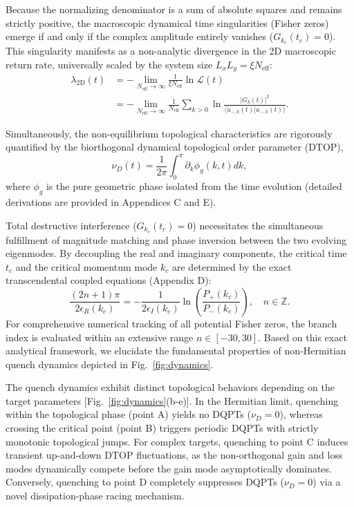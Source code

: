 \documentclass[aps,prb,floatfix,superscriptaddress,reprint]{revtex4-2}
\begin{document}
Because the normalizing denominator is a sum of absolute squares and remains strictly positive, the macroscopic dynamical time singularities (Fisher zeros) emerge if and only if the complex amplitude entirely vanishes ($G_{k_c}(t_c) = 0$). This singularity manifests as a non-analytic divergence in the 2D macroscopic return rate, universally scaled by the system size $L_x L_y = \xi N_{\mathrm{eff}}$:
\begin{align}
    \lambda_{\mathrm{2D}}(t) &= -\lim_{N_{\mathrm{eff}} \to \infty} \frac{1}{\xi N_{\mathrm{eff}}} \ln \mathcal{L}(t) \nonumber \\
    &= -\lim_{N_{\mathrm{eff}} \to \infty} \frac{1}{N_{\mathrm{eff}}} \sum_{k>0} \ln \frac{|G_k(t)|^2}{\langle \tilde{u}_{-,k}(t) | u_{-,k}(t) \rangle}.
\end{align}

Simultaneously, the non-equilibrium topological characteristics are rigorously quantified by the biorthogonal dynamical topological order parameter (DTOP),
\begin{equation}
    \nu_D(t) = \frac{1}{2\pi} \int_0^\pi \partial_k \phi_{g}(k, t) dk,
\end{equation}
where $\phi_{g}$ is the pure geometric phase isolated from the time evolution (detailed derivations are provided in Appendices \textcolor[rgb]{0.00,0.07,1.00}{C} and \textcolor[rgb]{0.00,0.07,1.00}{E}).

Total destructive interference ($G_{k_c}(t_c) = 0$) necessitates the simultaneous fulfillment of magnitude matching and phase inversion between the two evolving eigenmodes. By decoupling the real and imaginary components, the critical time $t_c$ and the critical momentum mode $k_c$ are determined by the exact transcendental coupled equations (Appendix \textcolor[rgb]{0.00,0.07,1.00}{D}):
\begin{equation}
    \frac{(2n+1)\pi}{2\epsilon_R(k_c)} = -\frac{1}{2\epsilon_I(k_c)} \ln \left( \frac{P_+(k_c)}{P_-(k_c)} \right), \quad n \in \mathbb{Z}.
    \label{eq:tc_mag}
\end{equation}
For comprehensive numerical tracking of all potential Fisher zeros, the branch index is evaluated within an extensive range $n \in [-30, 30]$. Based on this exact analytical framework, we elucidate the fundamental properties of non-Hermitian quench dynamics depicted in Fig.~\ref{fig:dynamics}.

The quench dynamics exhibit distinct topological behaviors depending on the target parameters [Fig.~\ref{fig:dynamics}(b-e)]. In the Hermitian limit, quenching within the topological phase (point A) yields no DQPTs ($\nu_D=0$), whereas crossing the critical point (point B) triggers periodic DQPTs with strictly monotonic topological jumps. For complex targets, quenching to point C induces transient up-and-down DTOP fluctuations, as the non-orthogonal gain and loss modes dynamically compete before the gain mode asymptotically dominates. Conversely, quenching to point D completely suppresses DQPTs ($\nu_D=0$) via a novel dissipation-phase racing mechanism.
\end{document}
